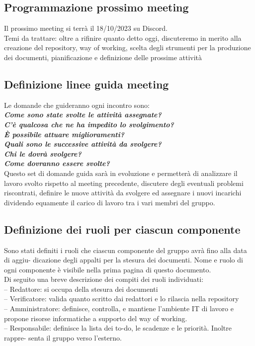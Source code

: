 \documentclass{article}
\begin{document}
    \subsection{Programmazione prossimo meeting}
        Il prossimo meeting si terrà il 18/10/2023 su Discord. \\
        Temi da trattare: oltre a rifinire quanto detto oggi, discuteremo in merito alla creazione del repository, way of working, scelta degli strumenti per la produzione dei documenti, pianificazione e definizione delle prossime attività

    \subsection{Definizione linee guida meeting}
        Le domande che guideranno ogni incontro sono:\\
        \textbf{\textit{Come sono state svolte le attività assegnate?\\C’è qualcosa che ne ha impedito lo svolgimento?\\ È possibile attuare miglioramenti?\\
        Quali sono le successive attività da svolgere?\\ Chi le dovrà svolgere?\\ Come dovranno essere svolte?}}\\
        Questo set di domande guida sarà in evoluzione e permetterà di analizzare il lavoro svolto rispetto al meeting precedente, discutere degli eventuali problemi riscontrati, definire le nuove attività da svolgere ed assegnare i nuovi incarichi dividendo equamente il carico di lavoro tra i vari membri del gruppo.

    \subsection{Definizione dei ruoli per ciascun componente}
        Sono stati definiti i ruoli che ciascun componente del gruppo avrà fino alla data di aggiu- dicazione degli appalti per la stesura dei documenti. Nome e ruolo di ogni componente è visibile nella prima pagina di questo documento. \\
        Di seguito una breve descrizione dei compiti dei ruoli individuati:\\– Redattore: si occupa della stesura dei documenti\\
        – Verificatore: valida quanto scritto dai redattori e lo rilascia nella repository\\
        – Amministratore: definisce, controlla, e mantiene l’ambiente IT di lavoro e propone risorse informatiche a supporto del way of working.\\
        – Responsabile: definisce la lista dei to-do, le scadenze e le priorità. Inoltre rappre- senta il gruppo verso l’esterno.
\end{document}

